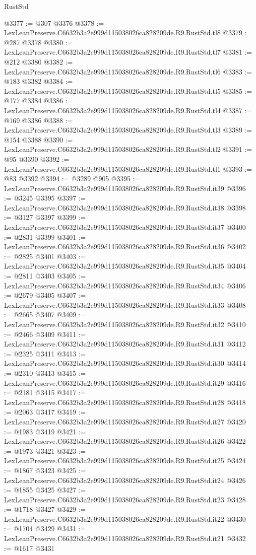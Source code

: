 \begin{lexlean}{RustStd}
\begin{coremodule}
@3377 := @307 @3376
@3378 := LexLeanPreserve.C6632b3a2e999d115038026ca828209de.R9.RustStd.tl8
@3379 := @287 @3378
@3380 := LexLeanPreserve.C6632b3a2e999d115038026ca828209de.R9.RustStd.tl7
@3381 := @212 @3380
@3382 := LexLeanPreserve.C6632b3a2e999d115038026ca828209de.R9.RustStd.tl6
@3383 := @183 @3382
@3384 := LexLeanPreserve.C6632b3a2e999d115038026ca828209de.R9.RustStd.tl5
@3385 := @177 @3384
@3386 := LexLeanPreserve.C6632b3a2e999d115038026ca828209de.R9.RustStd.tl4
@3387 := @169 @3386
@3388 := LexLeanPreserve.C6632b3a2e999d115038026ca828209de.R9.RustStd.tl3
@3389 := @154 @3388
@3390 := LexLeanPreserve.C6632b3a2e999d115038026ca828209de.R9.RustStd.tl2
@3391 := @95 @3390
@3392 := LexLeanPreserve.C6632b3a2e999d115038026ca828209de.R9.RustStd.tl1
@3393 := @83 @3392
@3394 := @3289 @905
@3395 := LexLeanPreserve.C6632b3a2e999d115038026ca828209de.R9.RustStd.it39
@3396 := @3245 @3395
@3397 := LexLeanPreserve.C6632b3a2e999d115038026ca828209de.R9.RustStd.it38
@3398 := @3127 @3397
@3399 := LexLeanPreserve.C6632b3a2e999d115038026ca828209de.R9.RustStd.it37
@3400 := @2831 @3399
@3401 := LexLeanPreserve.C6632b3a2e999d115038026ca828209de.R9.RustStd.it36
@3402 := @2825 @3401
@3403 := LexLeanPreserve.C6632b3a2e999d115038026ca828209de.R9.RustStd.it35
@3404 := @2811 @3403
@3405 := LexLeanPreserve.C6632b3a2e999d115038026ca828209de.R9.RustStd.it34
@3406 := @2679 @3405
@3407 := LexLeanPreserve.C6632b3a2e999d115038026ca828209de.R9.RustStd.it33
@3408 := @2665 @3407
@3409 := LexLeanPreserve.C6632b3a2e999d115038026ca828209de.R9.RustStd.it32
@3410 := @2466 @3409
@3411 := LexLeanPreserve.C6632b3a2e999d115038026ca828209de.R9.RustStd.it31
@3412 := @2325 @3411
@3413 := LexLeanPreserve.C6632b3a2e999d115038026ca828209de.R9.RustStd.it30
@3414 := @2310 @3413
@3415 := LexLeanPreserve.C6632b3a2e999d115038026ca828209de.R9.RustStd.it29
@3416 := @2181 @3415
@3417 := LexLeanPreserve.C6632b3a2e999d115038026ca828209de.R9.RustStd.it28
@3418 := @2063 @3417
@3419 := LexLeanPreserve.C6632b3a2e999d115038026ca828209de.R9.RustStd.it27
@3420 := @1983 @3419
@3421 := LexLeanPreserve.C6632b3a2e999d115038026ca828209de.R9.RustStd.it26
@3422 := @1973 @3421
@3423 := LexLeanPreserve.C6632b3a2e999d115038026ca828209de.R9.RustStd.it25
@3424 := @1867 @3423
@3425 := LexLeanPreserve.C6632b3a2e999d115038026ca828209de.R9.RustStd.it24
@3426 := @1855 @3425
@3427 := LexLeanPreserve.C6632b3a2e999d115038026ca828209de.R9.RustStd.it23
@3428 := @1718 @3427
@3429 := LexLeanPreserve.C6632b3a2e999d115038026ca828209de.R9.RustStd.it22
@3430 := @1704 @3429
@3431 := LexLeanPreserve.C6632b3a2e999d115038026ca828209de.R9.RustStd.it21
@3432 := @1617 @3431

\end{coremodule}
\end{lexlean}
